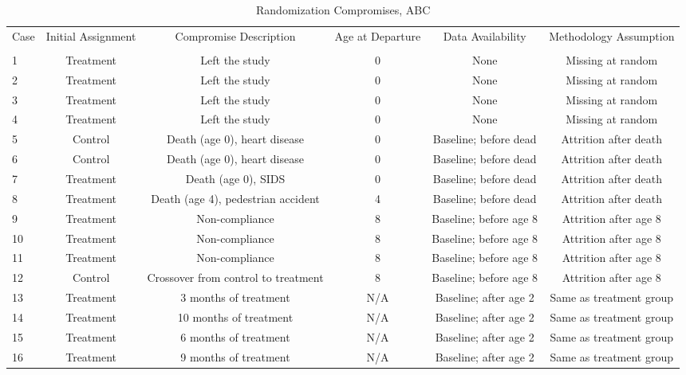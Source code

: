 \begin{sidewaystable}[H] 
\begin{threeparttable}
\caption{Randomization Compromises, ABC}
\label{table:abccompromises}
\centering
\footnotesize
\begin{tabular}{lccccc} \toprule
Case & Initial Assignment & Compromise Description & Age at Departure & Data Availability & Methodology Assumption \\ \\ \midrule
1& Treatment & Left the study & 0 & None & Missing at random \\
2& Treatment & Left the study & 0 &  None & Missing at random \\
3& Treatment & Left the study & 0 &  None & Missing at random \\
4& Treatment & Left the study & 0 &  None & Missing at random \\ \midrule
5& Control  & Death (age 0), heart disease & 0 &  Baseline; before dead & Attrition after death \\
6&Control  & Death (age 0), heart disease & 0 &  Baseline; before dead & Attrition after death \\
7&Treatment & Death (age 0), SIDS & 0 &  Baseline; before dead & Attrition after death \\
8&Treatment  & Death (age 4), pedestrian accident & 4 &  Baseline; before dead & Attrition after death \\ \midrule
9&Treatment  & Non-compliance  & 8 &  Baseline; before age 8 & Attrition after age 8  \\
10&Treatment  & Non-compliance  & 8 &  Baseline; before age 8 & Attrition after age 8  \\
11&Treatment  & Non-compliance  & 8 &  Baseline; before age 8 & Attrition after age 8  \\ \midrule
12&Control        & Crossover from control to treatment & 8 &  Baseline; before age 8 & Attrition after age 8  \\ \midrule
13&Treatment   & 3 months of treatment & N/A &   Baseline; after age 2 & Same as treatment group  \\  
14&Treatment &10 months of treatment & N/A  &   Baseline; after age 2 & Same as treatment group  \\
15&Treatment & 6 months of treatment &  N/A &   Baseline; after age 2 & Same as treatment group  \\ 
16&Treatment & 9 months of treatment & N/A  &   Baseline; after age 2 & Same as treatment group  \\  \midrule

\end{tabular}
\end{threeparttable}
\end{sidewaystable}

